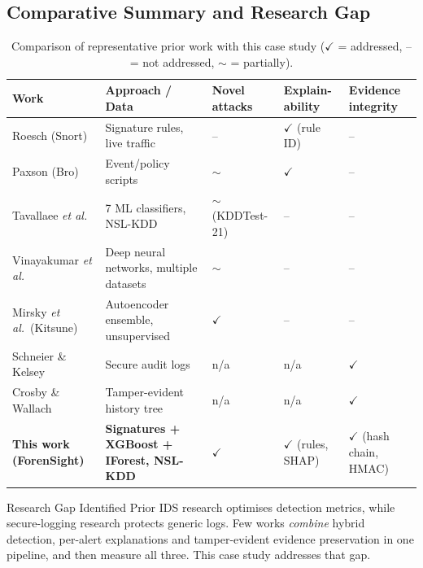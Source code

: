 \documentclass[12pt,a4paper,oneside]{article}
\begin{document}
\subsection{Comparative Summary and Research Gap}
\begin{table}[H]\centering\small
\caption{Comparison of representative prior work with this case study ($\checkmark$ = addressed, -- = not addressed, $\sim$ = partially).}\label{tab:lit}
\begin{tabularx}{\linewidth}{p{3.0cm} Y >{\centering\arraybackslash}p{1.35cm} >{\centering\arraybackslash}p{1.45cm} >{\centering\arraybackslash}p{1.45cm}}
\toprule
\textcolor{rblue}{Work} & \textcolor{rblue}{Approach / Data} & \textcolor{rblue}{Novel attacks} & \textcolor{rblue}{Explain-ability} & \textcolor{rblue}{Evidence integrity} \\ \midrule
Roesch (Snort) \cite{roesch1999snort} & Signature rules, live traffic & -- & $\checkmark$ (rule ID) & -- \\
Paxson (Bro) \cite{paxson1999bro} & Event/policy scripts & $\sim$ & $\checkmark$ & -- \\
Tavallaee \emph{et al.}\ \cite{tavallaee2009detailed} & 7 ML classifiers, NSL-KDD & $\sim$ (KDDTest-21) & -- & -- \\
Vinayakumar \emph{et al.}\ \cite{vinayakumar2019deep} & Deep neural networks, multiple datasets & $\sim$ & -- & -- \\
Mirsky \emph{et al.}\ (Kitsune) \cite{mirsky2018kitsune} & Autoencoder ensemble, unsupervised & $\checkmark$ & -- & -- \\
Schneier \& Kelsey \cite{schneier1999secure} & Secure audit logs & n/a & n/a & $\checkmark$ \\
Crosby \& Wallach \cite{crosby2009efficient} & Tamper-evident history tree & n/a & n/a & $\checkmark$ \\
\textbf{This work (ForenSight)} & \textbf{Signatures + XGBoost + IForest, NSL-KDD} & $\checkmark$ & $\checkmark$ (rules, SHAP) & $\checkmark$ (hash chain, HMAC) \\
\bottomrule
\end{tabularx}
\end{table}

\begin{keybox}{Research Gap Identified}
Prior IDS research optimises detection metrics, while secure-logging research protects generic logs. Few works \emph{combine} hybrid detection, per-alert explanations and tamper-evident evidence preservation in one pipeline, and then measure all three. This case study addresses that gap.
\end{keybox}
\end{document}
